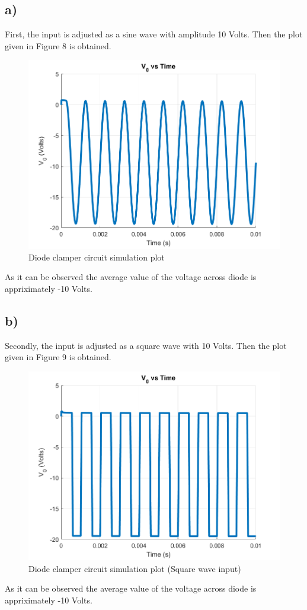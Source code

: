 \documentclass[letterpaper,12pt]{article}
\begin{document}
\subsection{a)}
First, the input is adjusted as a sine wave with amplitude 10 Volts. Then the plot given in Figure 8 is obtained.
\begin{figure}[H]
    \centering
   \includegraphics[width=1\textwidth]{5a.png}
   \caption{Diode clamper circuit simulation plot}
\end{figure} 
As it can be observed the average value of the voltage across diode is appriximately -10 Volts.
\subsection{b)}
Secondly, the input is adjusted as a square wave with 10 Volts. Then the plot given in Figure 9 is obtained.

\begin{figure}[H]
    \centering
   \includegraphics[width=1\textwidth]{5b.png}
   \caption{Diode clamper circuit simulation plot (Square wave input)}
\end{figure} 
As it can be observed the average value of the voltage across diode is appriximately -10 Volts. 
\end{document}
